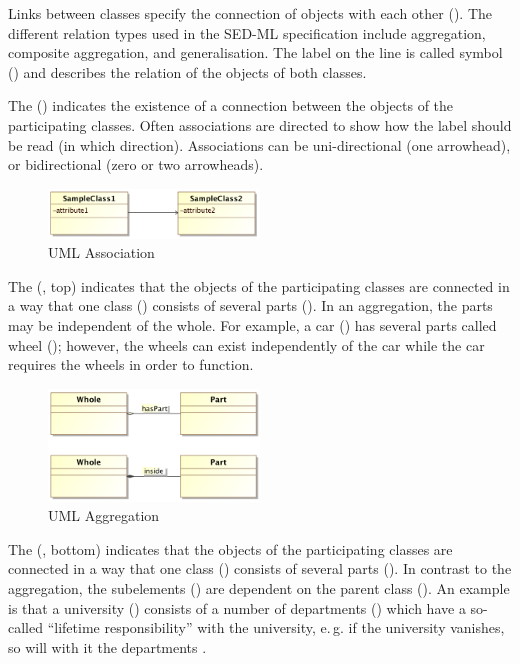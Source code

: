 Links between classes specify the connection of objects with each other (). The different relation types used in the SED-ML specification include aggregation, composite aggregation, and generalisation. The label on the line is called symbol () and describes the relation of the objects of both classes. 

The  () indicates the existence of a connection between the objects of the participating classes. Often associations are directed to show how the label should be read (in which direction). Associations can be uni-directional (one arrowhead), or bidirectional (zero or two arrowheads). 
\begin{figure}[h]
\centering
\includegraphics[width=0.5\textwidth]{images/uml/umlAssociation.png}
\caption{UML Association}
\label{fig:umlAssociation}
\end{figure}

 
The  (, top) indicates that the objects of the participating classes are connected in a way that one class () consists of several parts (). In an aggregation, the parts may be independent of the whole. For example, a car ()  has several parts called wheel (); however, the wheels can exist independently of the car while the car requires the wheels in order to function.
\begin{figure}[h]
\centering
\includegraphics[width=0.5\textwidth]{images/uml/umlAggregation.png}
\caption{UML Aggregation}
\label{fig:umlAggregation}
\end{figure}

The  (, bottom) indicates that the objects of the participating classes are connected in a way that one class () consists of several parts (). In contrast to the aggregation, the subelements () are dependent on the parent class (). An example is that a university () consists of a number of departments () which have a so-called ``lifetime responsibility'' with the university, e.\,g. if the university vanishes, so will with it the departments \cite{Bel03}.

